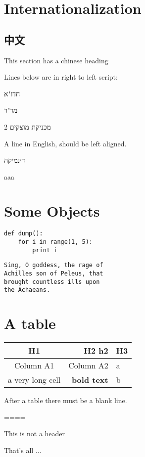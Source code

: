 \section{Internationalization}



\subsection{中文}

This section has a chinese heading



Lines below are in right to left script:



חדו"א

מד"ר

מכניקת מוצקים 2

A line in English, should be left aligned.

דינמיקה



aaa





\section{Some Objects}




\begin{lstlisting}
def dump():
	for i in range(1, 5):
		print i

\end{lstlisting}





\begin{lstlisting}
Sing, O goddess, the rage of
Achilles son of Peleus, that
brought countless ills upon
the Achaeans.

\end{lstlisting}


\section{A table}

\begin{tabular}{ |c|r|l| }
\hline
 H1 & H2 h2 & H3 \tabularnewline
\hline
\hline
 Column A1 & Column    A2 & a \tabularnewline
\hline
 a very long cell & \textbf{bold text} & b \tabularnewline
\hline
\end{tabular}




After a table there must be a blank line.





====

This is not a header



That's all ...

